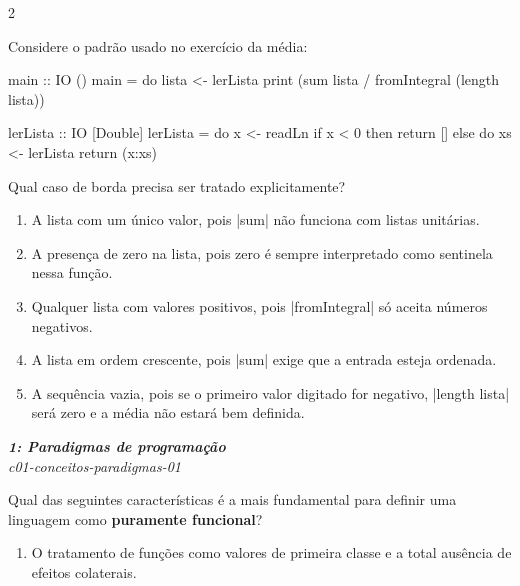 \documentclass[a4paper,10pt,brazil]{article}
\begin{document}
\begin{multicols}{2}
\begin{flushright}
\end{flushright}
Considere o padrão usado no exercício da média:

\begin{haskellcode}
main :: IO ()
main = do
  lista <- lerLista
  print (sum lista / fromIntegral (length lista))

lerLista :: IO [Double]
lerLista = do
  x <- readLn
  if x < 0
    then return []
    else do
      xs <- lerLista
      return (x:xs)
\end{haskellcode}

Qual caso de borda precisa ser tratado explicitamente?

\begin{enumerate}
  \item A lista com um único valor, pois \haskellinline|sum| não funciona com listas unitárias.

  \item A presença de zero na lista, pois zero é sempre interpretado como sentinela nessa função.

  \item Qualquer lista com valores positivos, pois \haskellinline|fromIntegral| só aceita números negativos.

  \item A lista em ordem crescente, pois \haskellinline|sum| exige que a entrada esteja ordenada.

  \item A sequência vazia, pois se o primeiro valor digitado for negativo, \haskellinline|length lista| será zero e a média não estará bem definida.


\end{enumerate}

\begin{flushright}
  \footnotesize
  \textit{\textbf{1: Paradigmas de programação}}\\
  \textit{c01-conceitos-paradigmas-01}\\

\end{flushright}
Qual das seguintes características é a mais fundamental para definir uma linguagem como \textbf{puramente funcional}?

\begin{enumerate}
  \item O tratamento de funções como valores de primeira classe e a total ausência de efeitos colaterais.


\end{enumerate}
\end{multicols}
\end{document}
